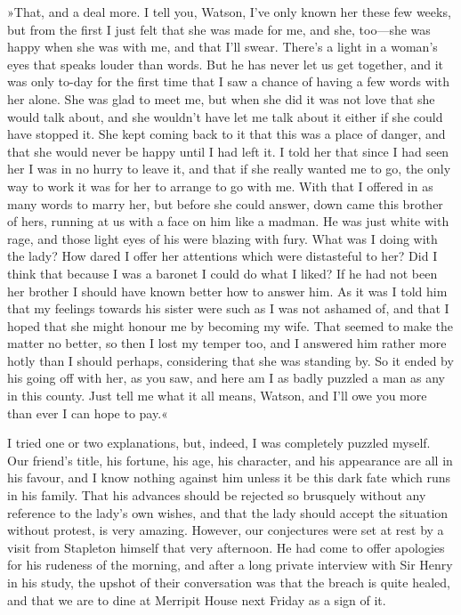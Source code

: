 »That, and a deal more. I tell you, Watson, I've only known her these few weeks, but from the first I just felt that she was made for me, and she, too—she was happy when she was with me, and that I'll swear. There's a light in a woman's eyes that speaks louder than words. But he has never let us get together, and it was only to-day for the first time that I saw a chance of having a few words with her alone. She was glad to meet me, but when she did it was not love that she would talk about, and she wouldn't have let me talk about it either if she could have stopped it. She kept coming back to it that this was a place of danger, and that she would never be happy until I had left it. I told her that since I had seen her I was in no hurry to leave it, and that if she really wanted me to go, the only way to work it was for her to arrange to go with me. With that I offered in as many words to marry her, but before she could answer, down came this brother of hers, running at us with a face on him like a madman. He was just white with rage, and those light eyes of his were blazing with fury. What was I doing with the lady? How dared I offer her attentions which were distasteful to her? Did I think that because I was a baronet I could do what I liked? If he had not been her brother I should have known better how to answer him. As it was I told him that my feelings towards his sister were such as I was not ashamed of, and that I hoped that she might honour me by becoming my wife. That seemed to make the matter no better, so then I lost my temper too, and I answered him rather more hotly than I should perhaps, considering that she was standing by. So it ended by his going off with her, as you saw, and here am I as badly puzzled a man as any in this county. Just tell me what it all means, Watson, and I'll owe you more than ever I can hope to pay.«

I tried one or two explanations, but, indeed, I was completely puzzled myself. Our friend's title, his fortune, his age, his character, and his appearance are all in his favour, and I know nothing against him unless it be this dark fate which runs in his family. That his advances should be rejected so brusquely without any reference to the lady's own wishes, and that the lady should accept the situation without protest, is very amazing. However, our conjectures were set at rest by a visit from Stapleton himself that very afternoon. He had come to offer apologies for his rudeness of the morning, and after a long private interview with Sir Henry in his study, the upshot of their conversation was that the breach is quite healed, and that we are to dine at Merripit House next Friday as a sign of it.

